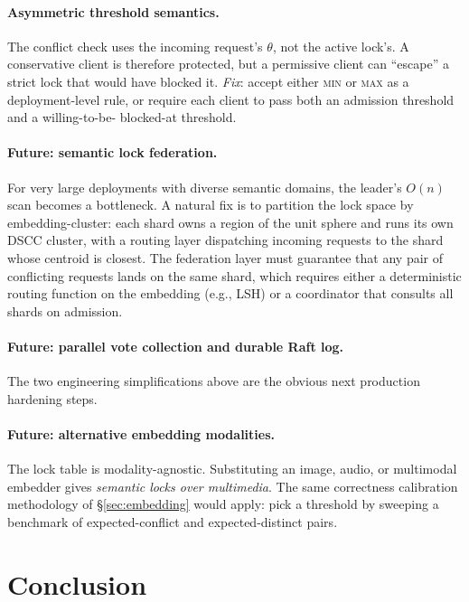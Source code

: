 \documentclass[sigconf]{acmart}
\begin{document}
\paragraph{Asymmetric threshold semantics.} The conflict check uses
the incoming request's $\theta$, not the active lock's. A conservative
client is therefore protected, but a permissive client can ``escape''
a strict lock that would have blocked it. \emph{Fix}: accept either
\textsc{min} or \textsc{max} as a deployment-level rule, or require
each client to pass both an admission threshold and a willing-to-be-
blocked-at threshold.

\paragraph{Future: semantic lock federation.} For very large
deployments with diverse semantic domains, the leader's $O(n)$ scan
becomes a bottleneck. A natural fix is to partition the lock space by
embedding-cluster: each shard owns a region of the unit sphere and runs
its own DSCC cluster, with a routing layer dispatching incoming
requests to the shard whose centroid is closest. The federation layer
must guarantee that any pair of conflicting requests lands on the same
shard, which requires either a deterministic routing function on the
embedding (e.g., LSH) or a coordinator that consults all shards on
admission.

\paragraph{Future: parallel vote collection and durable Raft log.}
The two engineering simplifications above are the obvious next
production hardening steps.

\paragraph{Future: alternative embedding modalities.} The lock table is
modality-agnostic. Substituting an image, audio, or multimodal embedder
gives \emph{semantic locks over multimedia}. The same correctness
calibration methodology of \S\ref{sec:embedding} would apply: pick a
threshold by sweeping a benchmark of expected-conflict and
expected-distinct pairs.

\section{Conclusion}
\label{sec:conclusion}
\end{document}
